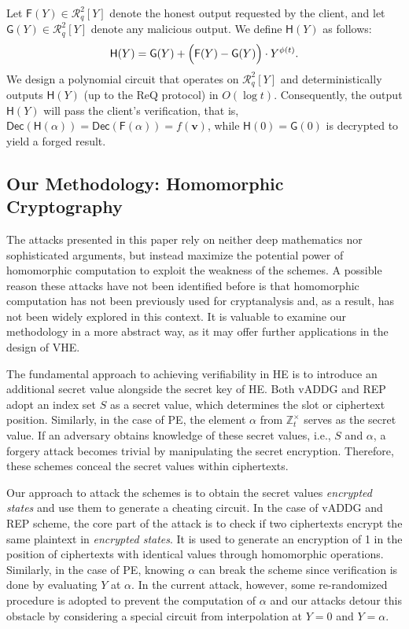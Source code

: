 \documentclass[runningheads]{llncs}
\newcommand{\REP}{\textsf{REP}{}}
\newcommand{\PE}{\textsf{PE}{}}
\newcommand{\REQ}{\textsf{ReQ}}
\newcommand{\dec}{\textsf{Dec}}
\begin{document}
        Let \(\mathsf{F}(Y) \in \mathcal{R}^2_q[Y]\) denote the honest output requested by the client, and let \(\mathsf{G}(Y) \in \mathcal{R}^2_q[Y]\) denote any malicious output. We define \(\mathsf{H}(Y)\) as follows:
            \[
            \mathsf{H}(Y) = \mathsf{G}(Y) + \Bigl(\mathsf{F}(Y) - \mathsf{G}(Y)\Bigr) \cdot Y^{\phi(t)}.
            \]
        We design a polynomial circuit that operates on \(\mathcal{R}^2_q[Y]\) and deterministically outputs \(\mathsf{H}(Y)\) (up to the \REQ{} protocol) in $O(\log t)$. Consequently, the output \(\mathsf{H}(Y)\) will pass the client's verification, that is, \(\dec(\mathsf{H}(\alpha)) = \dec(\mathsf{F}(\alpha)) = f(\mathbf{v})\), while \(\mathsf{H}(0) = \mathsf{G}(0)\) is decrypted to yield a forged result. 


    \subsection{Our Methodology: Homomorphic Cryptography}
The attacks presented in this paper rely on neither deep mathematics nor sophisticated arguments, but instead maximize the potential power of homomorphic computation to exploit the weakness of the schemes.
A possible reason these attacks have not been identified before is that homomorphic computation has not been previously used for cryptanalysis and, as a result, has not been widely explored in this context. It is valuable to examine our methodology in a more abstract way, as it may offer further applications in the design of VHE.

The fundamental approach to achieving verifiability in HE is to introduce an additional secret value alongside the secret key of HE. Both vADDG and \REP{} adopt an index set $S$ as a secret value, which determines the slot or ciphertext position. Similarly, in the case of \PE{}, the element $\alpha$ from \( \mathbb{Z}_t^\times \) serves as the secret value. If an adversary obtains knowledge of these secret values, i.e., $S$ and $\alpha$, a forgery attack becomes trivial by manipulating the secret encryption. Therefore, these schemes conceal the secret values within ciphertexts.

Our approach to attack the schemes is to obtain the secret values {\em encrypted states} and use them to generate a cheating circuit.
In the case of vADDG and \REP{} scheme, the core part of the attack is to check if two ciphertexts encrypt the same plaintext in {\em encrypted states}. It is used to generate an encryption of 1 in the position of ciphertexts with identical values through homomorphic operations. Similarly, in the case of \PE{}, knowing $\alpha$ can break the scheme since verification is done by evaluating \( Y \) at \( \alpha \). In the current attack, however, some re-randomized procedure is adopted to prevent the computation of $\alpha$ and our attacks detour this obstacle by considering a special circuit from interpolation at \( Y = 0 \) and \( Y = \alpha \). 
\end{document}
